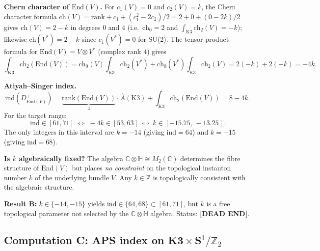 \documentclass[11pt,a4paper]{article}
\theoremstyle{definition}
\theoremstyle{remark}
\begin{document}
\textbf{Chern character of $\mathrm{End}(V)$.}
For $c_1(V)=0$ and $c_2(V)=k$, the Chern character formula
$\mathrm{ch}(V) = \mathrm{rank} + c_1 + (c_1^2-2c_2)/2 = 2+0+(0-2k)/2$
gives $\mathrm{ch}(V)=2-k$ in degrees $0$ and $4$ (i.e.\ $\mathrm{ch}_0=2$
and $\int_{\mathrm{K3}}\mathrm{ch}_2(V)=-k$); likewise $\mathrm{ch}(V^*)=2-k$
since $c_1(V^*)=0$ for SU(2).
The tensor-product formula for $\mathrm{End}(V)=V\otimes V^*$
(complex rank $4$) gives
\begin{equation}
  \int_{\mathrm{K3}}\mathrm{ch}_2(\mathrm{End}(V))
  = \mathrm{ch}_0(V)\!\int_{\mathrm{K3}}\!\mathrm{ch}_2(V^*)
    + \mathrm{ch}_0(V^*)\!\int_{\mathrm{K3}}\!\mathrm{ch}_2(V)
  = 2(-k)+2(-k) = -4k.
  \label{eq:ch2_EndV}
\end{equation}

\textbf{Atiyah--Singer index.}
\begin{equation}
  \mathrm{ind}(D^+_{\mathrm{End}(V)})
  = \underbrace{\mathrm{rank}(\mathrm{End}(V))}_{4}\cdot\hat{A}(\mathrm{K3})
    + \int_{\mathrm{K3}}\mathrm{ch}_2(\mathrm{End}(V))
  = 8-4k.
  \label{eq:ind_EndV}
\end{equation}
For the target range:
\begin{equation}
  \mathrm{ind}\in[61,71]
  \;\Longleftrightarrow\;
  -4k\in[53,63]
  \;\Longleftrightarrow\;
  k\in[-15.75,\,-13.25].
\end{equation}
The only integers in this interval are $k=-14$ (giving $\mathrm{ind}=64$)
and $k=-15$ (giving $\mathrm{ind}=68$).

\textbf{Is $k$ algebraically fixed?}
The algebra $\mathbb{C}\otimes\mathbb{H}\cong M_2(\mathbb{C})$ determines
the fibre structure of $\mathrm{End}(V)$ but places \emph{no constraint} on
the topological instanton number $k$ of the underlying bundle $V$.  Any
$k\in\mathbb{Z}$ is topologically consistent with the algebraic structure.

\textbf{Result B:}
$k\in\{-14,-15\}$ yields $\mathrm{ind}\in\{64,68\}\subset[61,71]$, but $k$
is a free topological parameter not selected by the $\mathbb{C}\otimes\mathbb{H}$
algebra.  Status: \textbf{[DEAD END]}.

\subsection{Computation C: APS index on K3\,$\times$\,S$^1/\mathbb{Z}_2$}
\label{subsec:L2_compC}
\end{document}
